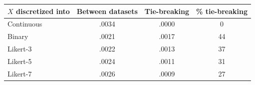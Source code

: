 \begin{tabular}{lccc}
\toprule
$X$ discretized into & Between datasets & Tie-breaking & \% tie-breaking \\
\midrule
Continuous & .0034 & .0000 & 0 \\
Binary & .0021 & .0017 & 44 \\
Likert-3 & .0022 & .0013 & 37 \\
Likert-5 & .0024 & .0011 & 31 \\
Likert-7 & .0026 & .0009 & 27 \\
\bottomrule
\end{tabular}
